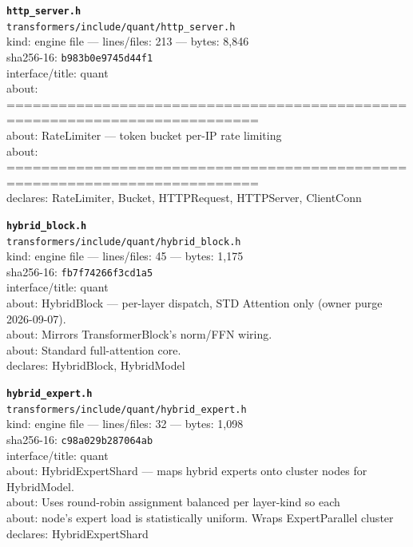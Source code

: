 \noindent\textbf{\texttt{http\_server.h}}\\
\texttt{transformers/include/quant/http\_server.h}\\
kind: engine file --- lines/files: 213 --- bytes: 8,846\\
sha256-16: \texttt{b983b0e9745d44f1}\\
interface/title: quant\\
about: ===========================================================================\\
about: RateLimiter — token bucket per-IP rate limiting\\
about: ===========================================================================\\
declares: RateLimiter, Bucket, HTTPRequest, HTTPServer, ClientConn\\
\vspace*{6.0pt}

\noindent\textbf{\texttt{hybrid\_block.h}}\\
\texttt{transformers/include/quant/hybrid\_block.h}\\
kind: engine file --- lines/files: 45 --- bytes: 1,175\\
sha256-16: \texttt{fb7f74266f3cd1a5}\\
interface/title: quant\\
about: HybridBlock — per-layer dispatch, STD Attention only (owner purge 2026-09-07).\\
about: Mirrors TransformerBlock's norm/FFN wiring.\\
about: Standard full-attention core.\\
declares: HybridBlock, HybridModel\\
\vspace*{6.0pt}
\newpage

\noindent\textbf{\texttt{hybrid\_expert.h}}\\
\texttt{transformers/include/quant/hybrid\_expert.h}\\
kind: engine file --- lines/files: 32 --- bytes: 1,098\\
sha256-16: \texttt{c98a029b287064ab}\\
interface/title: quant\\
about: HybridExpertShard — maps hybrid experts onto cluster nodes for HybridModel.\\
about: Uses round-robin assignment balanced per layer-kind so each\\
about: node's expert load is statistically uniform. Wraps ExpertParallel cluster\\
declares: HybridExpertShard\\
\vspace*{6.0pt}


